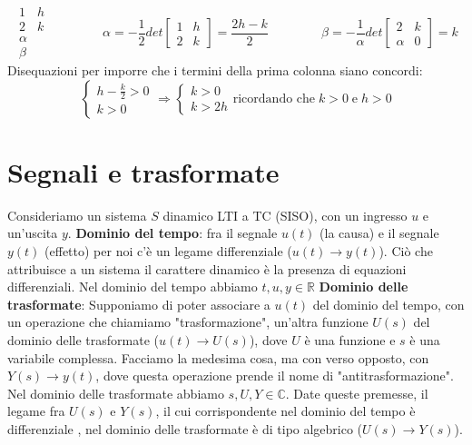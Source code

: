 \[
    \begin{matrix}
        1&h\\
        2&k\\
        \alpha\\
        \beta
    \end{matrix} \;\;\;\;\;\;\;\;\;\;\;\;\;\;\;\alpha = - \frac{1}{2}det \left[\begin{matrix}
        1&h\\2&k
    \end{matrix}\right] = \frac{2h-k}{2} \;\;\;\;\;\;\;\;\;\;\;\;\;\;\; \beta = - \frac{1}{\alpha} det \left[\begin{matrix}
        2 & k \\ \alpha & 0
    \end{matrix}\right] = k
\]
Disequazioni per imporre che i termini della prima colonna siano concordi:
\[
    \begin{cases}
        h - \frac{k}{2}>0\\
        k>0
    \end{cases} \Rightarrow \begin{cases}
        k>0\\
        k>2h
    \end{cases} \text{ricordando che} \; k>0 \;\text{e}\;h>0
\]
\newpage
\section{Segnali e trasformate}
Consideriamo un sistema $S$ dinamico LTI a TC (SISO), con un ingresso $u$ e un'uscita $y$.\newline
{}\newline
\newline
\textbf{Dominio del tempo}: fra il segnale $u(t)$ (la causa) e il segnale $y(t)$ (effetto) per noi c'è un legame differenziale ($u(t) \rightarrow y(t)$). Ciò che attribuisce a un sistema il carattere dinamico è la presenza di equazioni differenziali. Nel dominio del tempo abbiamo $t,u,y \in \mathbb{R}$\newline
\newline
\textbf{Dominio delle trasformate}: Supponiamo di poter associare a $u(t)$ del dominio del tempo, con un operazione che chiamiamo "trasformazione", un'altra funzione $U(s)$ del dominio delle trasformate ($u(t) \rightarrow U(s)$), dove $U$ è una funzione e $s$ è una variabile complessa. Facciamo la medesima cosa, ma con verso opposto, con $Y(s)\rightarrow y(t)$, dove questa operazione prende il nome di "antitrasformazione". Nel dominio delle trasformate abbiamo $s, U ,Y \in \mathbb{C}$.\newline
Date queste premesse, il legame fra $U(s)$ e $Y(s)$, il cui corrispondente nel dominio del tempo è differenziale , nel dominio delle trasformate è di tipo algebrico ($U(s) \rightarrow  Y(s)$).
